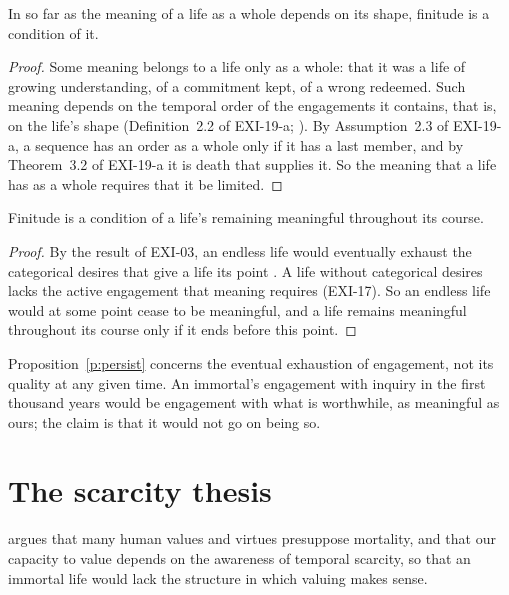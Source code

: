 \documentclass{situationist-preprint}
\begin{document}
\begin{proposition}\label{p:whole}
In so far as the meaning of a life as a whole depends on its shape, finitude is a condition of it.
\end{proposition}

\begin{proof}
Some meaning belongs to a life only as a whole: that it was a life of growing understanding, of a commitment kept, of a wrong redeemed. Such meaning depends on the temporal order of the engagements it contains, that is, on the life's shape (Definition~2.2 of EXI-19-a; \citealp{Velleman1991}). By Assumption~2.3 of EXI-19-a, a sequence has an order as a whole only if it has a last member, and by Theorem~3.2 of EXI-19-a it is death that supplies it. So the meaning that a life has as a whole requires that it be limited.
\end{proof}

\begin{proposition}\label{p:persist}
Finitude is a condition of a life's remaining meaningful throughout its course.
\end{proposition}

\begin{proof}
By the result of EXI-03, an endless life would eventually exhaust the categorical desires that give a life its point \citep{Williams1973}. A life without categorical desires lacks the active engagement that meaning requires (EXI-17). So an endless life would at some point cease to be meaningful, and a life remains meaningful throughout its course only if it ends before this point.
\end{proof}

Proposition~\ref{p:persist} concerns the eventual exhaustion of engagement, not its quality at any given time. An immortal's engagement with inquiry in the first thousand years would be engagement with what is worthwhile, as meaningful as ours; the claim is that it would not go on being so.

\section{The scarcity thesis}

\citet{Nussbaum1989} argues that many human values and virtues presuppose mortality, and \citet{Scheffler2013} that our capacity to value depends on the awareness of temporal scarcity, so that an immortal life would lack the structure in which valuing makes sense.
\end{document}
